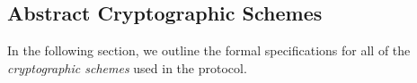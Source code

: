
\subsection{Abstract Cryptographic Schemes}

In the following section, we outline the formal specifications for all of the \emph{cryptographic schemes} used in the \MantaPay{} protocol.

% 

